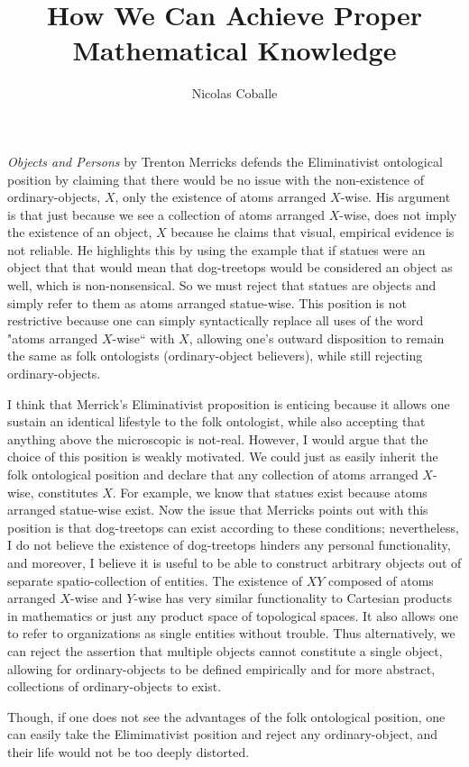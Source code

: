 \documentclass[11pt]{article}
\title{How We Can Achieve Proper Mathematical Knowledge}
\author{Nicolas Coballe}
\begin{document}
\doublespacing

\maketitle

\textit{Objects and Persons} by Trenton Merricks defends the Eliminativist ontological position by claiming that there would be no issue with the non-existence of ordinary-objects, $X$, only the existence of atoms arranged $X$-wise. His argument is that just because we see a collection of atoms arranged $X$-wise, does not imply the existence of an object, $X$ because he claims that visual, empirical evidence is not reliable. He highlights this by using the example that if statues were an object that that would mean that dog-treetops would be considered an object as well, which is non-nonsensical. So we must reject that statues are objects and simply refer to them as atoms arranged statue-wise. This position is not restrictive because one can simply syntactically replace all uses of the word "atoms arranged $X$-wise`` with $X$, allowing one's outward disposition to remain the same as folk ontologists (ordinary-object believers), while still rejecting ordinary-objects.

I think that Merrick's Eliminativist proposition is enticing because it allows one sustain an identical lifestyle to the folk ontologist, while also accepting that anything above the microscopic is not-real. However, I would argue that the choice of this position is weakly motivated. We could just as easily inherit the folk ontological position and declare that any collection of atoms arranged $X$-wise, constitutes $X$. For example, we know that statues exist because atoms arranged statue-wise exist. Now the issue that Merricks points out with this position is that dog-treetops can exist according to these conditions; nevertheless, I do not believe the existence of dog-treetops hinders any personal functionality, and moreover, I believe it is useful to be able to construct arbitrary objects out of separate spatio-collection of entities. The existence of $XY$ composed of atoms arranged $X$-wise and $Y$-wise has very similar functionality to Cartesian products in mathematics or just any product space of topological spaces. It also allows one to refer to organizations as single entities without trouble. Thus alternatively, we can reject the assertion that multiple objects cannot constitute a single object, allowing for ordinary-objects to be defined empirically and for more abstract, collections of ordinary-objects to exist.

Though, if one does not see the advantages of the folk ontological position, one can easily take the Elimimativist position and reject any ordinary-object, and their life would not be too deeply distorted.
\end{document}
